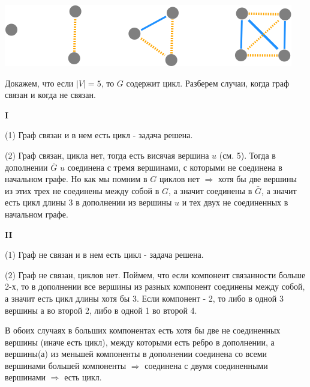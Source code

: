 \documentclass{article}
\begin{document}
\includegraphics[scale=0.5]{6_5.png}

Докажем, что если $|V| = 5$, то $G$ содержит цикл.
Разберем случаи, когда граф связан и когда не связан.

\textbf{I} 

(1) Граф связан и в нем есть цикл - задача решена.

(2) Граф связан, цикла нет, тогда есть висячая вершина $u$ (см. 5). Тогда в дополнении $ \bar{G} $ $u$ соединена с тремя вершинами, с которыми не соединена в начальном графе. Но как мы помним в $G$ циклов нет $\Rightarrow$ хотя бы две вершины из этих трех не соединены между собой в $G$, а значит соединены в $\bar{G}$, а значит есть цикл длины 3 в дополнении из вершины $u$ и тех двух не соединенных в начальном графе.

\textbf{II} 

(1) Граф не связан и в нем есть цикл - задача решена.

(2) Граф не связан, циклов нет. Поймем, что если компонент связанности больше 2-х, то в дополнении все вершины из разных компонент соединены между собой, а значит есть цикл длины хотя бы 3. Если компонент - 2, то либо в одной 3 вершины а во второй 2, либо в одной 1 во второй 4.

В обоих случаях в больших компонентах есть хотя бы две не соединенных вершины (иначе есть цикл), между которыми есть ребро в дополнении, а вершины(а) из меньшей компоненты в дополнении соединена со всеми вершинами большей компоненты $\Rightarrow$ соединена с двумя соединенными вершинами $ \Rightarrow $ есть цикл. 	
\end{document}
